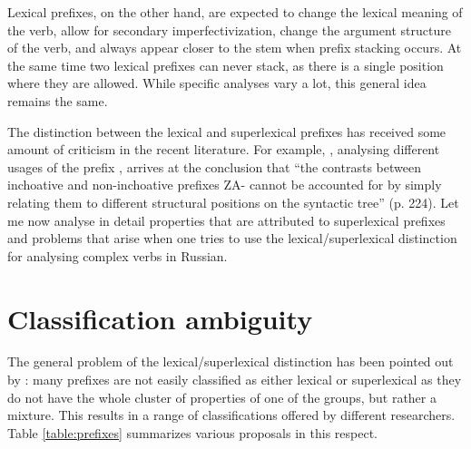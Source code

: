 Lexical prefixes, on the other hand, are expected to change the lexical meaning of the verb, allow for secondary imperfectivization, change the argument structure of the verb, and always appear closer to the stem when prefix stacking occurs. At the same time two lexical prefixes can never stack, as there is a single position where they are allowed. While specific analyses vary a lot, this general idea remains the same. 

The distinction between the lexical and superlexical prefixes has received some amount of criticism in the recent literature. For example, \citet{Braginsky:08}, analysing different usages of the prefix , arrives at the conclusion that ``the contrasts
between inchoative and non-inchoative prefixes ZA- cannot be accounted for by
simply relating them to different structural positions on the syntactic tree'' (p. 224). Let me now analyse in detail properties that are attributed to superlexical prefixes and problems that arise when one tries to use the lexical/superlexical distinction for analysing complex verbs in Russian.


\section{Classification ambiguity}\label{section:classification}
The general problem of the lexical/superlexical distinction has been pointed out by \citet[32]{Kagan:book}: many prefixes are not easily classified as either lexical or superlexical as they do not have the whole cluster of properties of one of the groups, but rather a mixture. This results in a range of classifications offered by different researchers. Table \ref{table:prefixes} summarizes various proposals in this respect.


